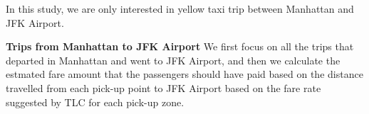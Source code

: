 \documentclass[12pt,twoside]{reedthesis}
\newenvironment{Shaded}{\begin{snugshade}}{\end{snugshade}}
\newcommand{\KeywordTok}[1]{\textcolor[rgb]{0.13,0.29,0.53}{\textbf{#1}}}
\newcommand{\DecValTok}[1]{\textcolor[rgb]{0.00,0.00,0.81}{#1}}
\newcommand{\FloatTok}[1]{\textcolor[rgb]{0.00,0.00,0.81}{#1}}
\newcommand{\StringTok}[1]{\textcolor[rgb]{0.31,0.60,0.02}{#1}}
\newcommand{\CommentTok}[1]{\textcolor[rgb]{0.56,0.35,0.01}{\textit{#1}}}
\newcommand{\OperatorTok}[1]{\textcolor[rgb]{0.81,0.36,0.00}{\textbf{#1}}}
\newcommand{\NormalTok}[1]{#1}
\theoremstyle{definition}
\theoremstyle{definition}
\theoremstyle{definition}
\theoremstyle{remark}
\begin{document}
In this study, we are only interested in yellow taxi trip between
Manhattan and JFK Airport.
\begin{Shaded}
\end{Shaded}
\textbf{Trips from Manhattan to JFK Airport} We first focus on all the
trips that departed in Manhattan and went to JFK Airport, and then we
calculate the estmated fare amount that the passengers should have paid
based on the distance travelled from each pick-up point to JFK Airport
based on the fare rate suggested by TLC for each pick-up zone.
\end{document}
